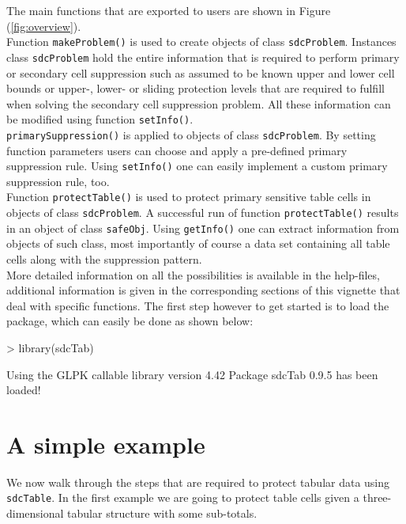 \documentclass{article}
\newcommand{\sdcTable}{{\tt sdcTable}}
\begin{document}
The main functions that are exported to users are shown in Figure (\ref{fig:overview}). \\

Function {\tt makeProblem()} is used to create objects of class {\tt sdcProblem}.
Instances class {\tt sdcProblem} hold the entire information that is required to 
perform primary or secondary cell suppression such as assumed to be known upper
and lower cell bounds or upper-, lower- or sliding protection levels that are 
required to fulfill when solving the secondary cell suppression problem. All these
information can be modified using function {\tt setInfo()}. \\

{\tt primarySuppression()} is applied to objects of class {\tt sdcProblem}. By 
setting function parameters users can choose and apply a pre-defined primary
suppression rule. Using {\tt setInfo()} one can easily implement a custom primary 
suppression rule, too. \\

Function {\tt protectTable()} is used to protect primary sensitive table cells in 
objects of class {\tt sdcProblem}. A successful run of  function {\tt protectTable()} 
results in an object of class {\tt safeObj}.  Using {\tt getInfo()} one can 
extract information from objects  of such class, most importantly of course 
a data set containing all table cells along with the suppression pattern. \\

More detailed information on all the possibilities is available in the help-files,
additional information is given in the corresponding sections of this vignette 
that deal with specific functions. The first step however to get started is to  
load the package, which can easily be done as  shown below:
\begin{Schunk}
\begin{Sinput}
> library(sdcTab)
\end{Sinput}
\begin{Soutput}
Using the GLPK callable library version 4.42
Package sdcTab 0.9.5 has been loaded!
\end{Soutput}
\end{Schunk}

\section{A simple example}
We now walk through the steps that are required to protect tabular data using 
\sdcTable. In the first example we are going to protect table cells given a 
three-dimensional tabular structure with some sub-totals. \\
\end{document}
